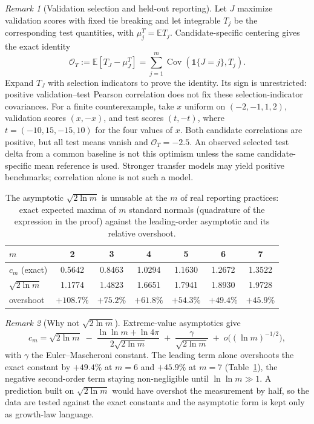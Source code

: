 \documentclass[10pt,letterpaper]{article}
\theoremstyle{remark}
\newtheorem*{remarkx}{Remark}
\begin{document}
\begin{remarkx}[Validation selection and held-out reporting]
Let $J$ maximize validation scores with fixed tie breaking and let integrable
$T_j$ be the corresponding test quantities, with $\mu_j^T=\mathbb ET_j$.
Candidate-specific centering gives the exact identity
\[
\mathcal O_T:=\mathbb E[T_J-\mu_J^T]
=\sum_{j=1}^m\operatorname{Cov}(\mathbf1\{J=j\},T_j).
\]
Expand $T_J$ with selection indicators to prove the identity. Its sign is
unrestricted: positive validation--test Pearson correlation does not fix
these selection-indicator covariances. For a finite counterexample, take
$x$ uniform on $(-2,-1,1,2)$, validation scores $(x,-x)$, and test scores
$(t,-t)$, where $t=(-10,15,-15,10)$ for the four values of $x$. Both candidate correlations
are positive, but all test means vanish and $\mathcal O_T=-2.5$.
An observed selected test delta from a common baseline is not this optimism
unless the same candidate-specific mean reference is used. Stronger transfer
models may yield positive benchmarks; correlation alone is not such a model.
\end{remarkx}
\begin{table}[tbp]
\centering
\small
\begin{tabular}{@{}lcccccc@{}}
\toprule
$m$ & 2 & 3 & 4 & 5 & 6 & 7 \\
\midrule
$c_m$ (exact) & 0.5642 & 0.8463 & 1.0294 & 1.1630 & 1.2672 & 1.3522 \\
$\sqrt{2\ln m}$ & 1.1774 & 1.4823 & 1.6651 & 1.7941 & 1.8930 & 1.9728 \\
overshoot & $+108.7\%$ & $+75.2\%$ & $+61.8\%$ & $+54.3\%$ & $+49.4\%$ &
$+45.9\%$ \\
\bottomrule
\end{tabular}
\caption{The asymptotic $\sqrt{2 \ln m}$ is unusable at the $m$ of real
reporting practices: exact expected maxima of $m$ standard normals
(quadrature of the expression in the proof) against the leading-order
asymptotic and its relative overshoot.}
\label{tab:cm}
\end{table}

\begin{remarkx}[Why not $\sqrt{2\ln m}$]
Extreme-value asymptotics give
\[
c_m = \sqrt{2\ln m}
\;-\; \frac{\ln \ln m + \ln 4\pi}{2\sqrt{2\ln m}}
\;+\; \frac{\gamma}{\sqrt{2\ln m}} \;+\; o\bigl((\ln m)^{-1/2}\bigr),
\]
with $\gamma$ the Euler--Mascheroni constant. The leading term alone
overshoots the exact constant by $+49.4\%$ at $m = 6$ and $+45.9\%$ at
$m = 7$ (Table~\ref{tab:cm}), the negative second-order term staying
non-negligible until $\ln \ln m \gg 1$. A prediction built on
$\sqrt{2 \ln m}$ would have overshot the measurement by half, so the data
are tested against the exact constants and the asymptotic form is kept
only as growth-law language.
\end{remarkx}
\end{document}
